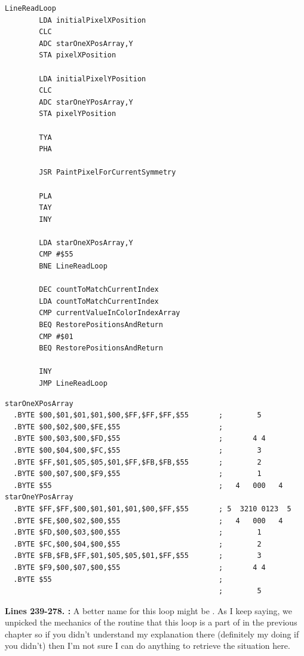 \clearpage
\begin{lstlisting}
LineReadLoop   
        LDA initialPixelXPosition
        CLC 
        ADC starOneXPosArray,Y
        STA pixelXPosition

        LDA initialPixelYPosition
        CLC 
        ADC starOneYPosArray,Y
        STA pixelYPosition

        TYA 
        PHA 

        JSR PaintPixelForCurrentSymmetry

        PLA 
        TAY 
        INY 

        LDA starOneXPosArray,Y
        CMP #$55
        BNE LineReadLoop

        DEC countToMatchCurrentIndex
        LDA countToMatchCurrentIndex
        CMP currentValueInColorIndexArray
        BEQ RestorePositionsAndReturn
        CMP #$01
        BEQ RestorePositionsAndReturn

        INY 
        JMP LineReadLoop

\end{lstlisting}
\begin{lstlisting}[basicstyle=\tiny]
starOneXPosArray
  .BYTE $00,$01,$01,$01,$00,$FF,$FF,$FF,$55       ;        5       
  .BYTE $00,$02,$00,$FE,$55                       ;                
  .BYTE $00,$03,$00,$FD,$55                       ;       4 4      
  .BYTE $00,$04,$00,$FC,$55                       ;        3       
  .BYTE $FF,$01,$05,$05,$01,$FF,$FB,$FB,$55       ;        2       
  .BYTE $00,$07,$00,$F9,$55                       ;        1       
  .BYTE $55                                       ;   4   000   4  
starOneYPosArray
  .BYTE $FF,$FF,$00,$01,$01,$01,$00,$FF,$55       ; 5  3210 0123  5
  .BYTE $FE,$00,$02,$00,$55                       ;   4   000   4  
  .BYTE $FD,$00,$03,$00,$55                       ;        1       
  .BYTE $FC,$00,$04,$00,$55                       ;        2       
  .BYTE $FB,$FB,$FF,$01,$05,$05,$01,$FF,$55       ;        3       
  .BYTE $F9,$00,$07,$00,$55                       ;       4 4      
  .BYTE $55                                       ;                
                                                  ;        5       
\end{lstlisting}
\clearpage

\textbf{Lines 239-278. :} A better name for this loop might be . As I keep saying, we unpicked the mechanics
of the  routine that this loop is a part of in the previous chapter so if you didn't understand my explanation there (definitely my doing if you didn't)
then I'm not sure I can do anything to retrieve the situation here.

